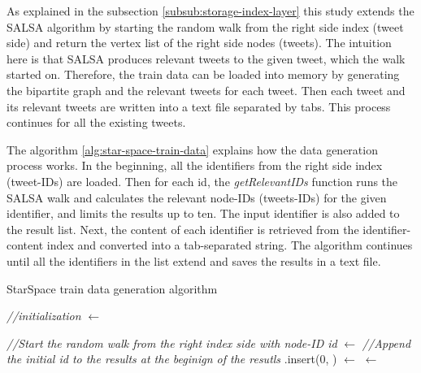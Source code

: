 As explained in the subsection \ref{subsub:storage-index-layer} this study extends the SALSA algorithm by starting the random walk from the right side index (tweet side) and return the vertex list of the right side nodes (tweets). The intuition here is that SALSA produces relevant tweets to the given tweet, which the walk started on. Therefore, the train data can be loaded into memory by generating the bipartite graph and the relevant tweets for each tweet. Then each tweet and its relevant tweets are written into a text file separated by tabs. This process continues for all the existing tweets.


The algorithm \ref{alg:star-space-train-data} explains how the data generation process works. In the beginning, all the identifiers from the right side index (tweet-IDs) are loaded. Then for each id, the \emph{getRelevantIDs} function runs the SALSA walk and calculates the relevant node-IDs (tweets-IDs) for the given identifier, and limits the results up to ten. The input identifier is also added to the result list. Next, the content of each identifier is retrieved from the identifier-content index and converted into a tab-separated string. The algorithm continues until all the identifiers in the list extend and saves the results in a text file.


\begin{algorithm}[!ht]
    \caption{StarSpace train data generation algorithm}
    \label{alg:star-space-train-data}




    \SetAlgoLined

    \BlankLine\emph{//initialization}\BlankLine
    \allIDs $\leftarrow$ \getAllRightIndexKeys{}\;

    \BlankLine

    {
        \emph{//Start the random walk from the right index side with node-ID id}\;
        \listRecommendations $\leftarrow$ \getRelevantIDs{\id}\;
        \BlankLine
        \emph{//Append the initial id to the results at the beginign of the resutls}\;
        \listRecommendations.insert(0, \id)\;
        \BlankLine
        \listContent $\leftarrow$ \getContentOf{\listRecommendations}\;
        \document $\leftarrow$ \;
        \;
    }

    \BlankLine
\end{algorithm}


